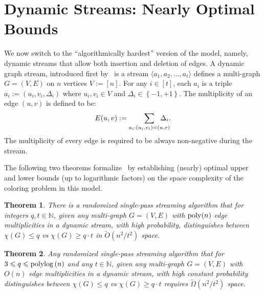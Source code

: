 \documentclass[11pt]{article}
\newtheorem{theorem}{Theorem}
\theoremstyle{definition}
\renewcommand{\leq}{\leqslant}
\renewcommand{\geq}{\geqslant}
\newcommand{\Ot}{\ensuremath{\widetilde{O}}}
\newcommand{\Omgt}{\ensuremath{\widetilde{\Omega}}}
\newcommand{\IN}{\ensuremath{\mathbb{N}}}
\newcommand{\set}[1]{\ensuremath{\left\{ #1 \right\}}}
\newcommand{\poly}{\mbox{\rm poly}}
\begin{document}
	\clearpage
	

\section{Dynamic Streams: Nearly Optimal Bounds}\label{sec:dynamic}

We now switch to the ``algorithmically hardest'' version of the model, namely, dynamic streams that allow both insertion and deletion of edges. A dynamic graph stream, introduced first by~\cite{AhnGM12} is a 
stream  $\langle a_1,a_2,\ldots,a_t \rangle$ defines a multi-graph $G=(V,E)$ on $n$ vertices $V := [n]$. For any $i \in [t]$, each $a_i$ is a triple $a_i := (u_i,v_i,\Delta_i)$ where $u_i,v_i \in V$ and $\Delta_i \in \set{-1,+1}$. 
The multiplicity of an edge $(u,v)$ is defined to be: 
\[
	E(u,v) := \sum_{a_i: (u_i,v_i) = (u,v)} \hspace{-15pt} \Delta_i.
\]
The multiplicity of every edge is required to be always non-negative during the stream. %



The following two theorems formalize~ 
by establishing (nearly) optimal upper and lower bounds (up to logarithmic factors) on the space complexity of the coloring problem in this model. 


\begin{theorem}\label{thm:dynamic-upper}
	There is a randomized single-pass streaming algorithm that for integers $q,t \in \IN$, given any multi-graph $G=(V,E)$ with $\poly(n)$ edge multiplicities in a dynamic stream, 
	with high probability, distinguishes between $\chi(G) \leq q$ vs $\chi(G) \geq q \cdot t$ in $\Ot(n^2/t^2)$ space.  
\end{theorem}

\begin{theorem}\label{thm:dynamic-lower}
	Any randomized single-pass streaming algorithm that for $3 \leq q \leq \poly\!\log{(n)}$ and any $t \in \IN$, given any multi-graph $G=(V,E)$ with $O(n)$ edge multiplicities in a dynamic stream, 
	with high constant probability distinguishes between $\chi(G) \leq q$ vs $\chi(G) \geq q \cdot t$ requires $\Omgt(n^2/t^2)$ space. 
\end{theorem}
\end{document}
